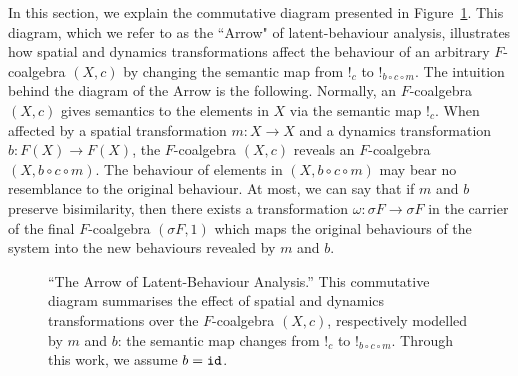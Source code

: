 In this section, we explain the commutative diagram presented in Figure~\ref{fig:TheArrow}. This diagram, which we refer to as the ``Arrow" of latent-behaviour analysis, illustrates how spatial and dynamics transformations affect the behaviour of an arbitrary $F$-coalgebra $(X,c)$ by changing the semantic map from $!_c$ to $!_{b\circ c\circ m}$. The intuition behind the diagram of the Arrow is the following. Normally, an $F$-coalgebra $(X,c)$ gives semantics to the elements in $X$ via the semantic map $!_c$. When affected by a spatial transformation $m\colon X\rightarrow X$ and a dynamics transformation $b\colon F(X)\rightarrow F(X)$, the $F$-coalgebra $(X,c)$ reveals an $F$-coalgebra $(X,b\circ c\circ m)$. The behaviour of elements in $(X,b\circ c\circ m)$ may bear no resemblance to the original behaviour. At most, we can say that if $m$ and $b$ preserve bisimilarity, then there exists a transformation $\omega\colon \sigma F \rightarrow \sigma F$ in the carrier of the final $F$-coalgebra $(\sigma F, 1)$ which maps the original behaviours of the system into the new behaviours revealed by $m$ and $b$. 

\begin{figure}[h]
        \centering
        \caption{``The Arrow of Latent-Behaviour Analysis.'' This commutative diagram summarises the effect of spatial and dynamics transformations over the $F$-coalgebra $(X,c)$, respectively modelled by $m$ and $b$: the semantic map changes from $!_c$ to $!_{b\circ c\circ m}$. Through this work, we assume $b={\texttt{id}}$.}
        \label{fig:TheArrow} 
    \end{figure}

